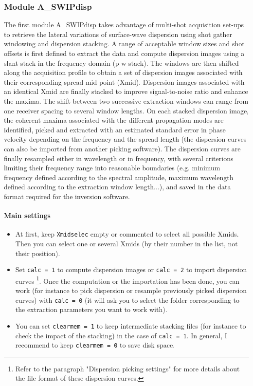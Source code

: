 \documentclass[twoside,a4paper]{article}
\begin{document}
\subsubsection{Module A\_SWIPdisp}
The first module A\_SWIPdisp takes advantage of multi-shot acquisition set-ups to retrieve the lateral variations of surface-wave dispersion using shot gather windowing and dispersion stacking. A range of acceptable window sizes and shot offsets is first defined to extract the data and compute dispersion images using a slant stack in the frequency domain (p-w stack). The windows are then shifted along the acquisition profile to obtain a set of dispersion images associated with their corresponding spread mid-point (Xmid). Dispersion images associated with an identical Xmid are finally stacked to improve signal-to-noise ratio and enhance the maxima. The shift between two successive extraction windows can range from one receiver spacing to several window lengths. On each stacked dispersion image, the coherent maxima associated with the different propagation modes are identified, picked and extracted with an estimated standard error in phase velocity depending on the frequency and the spread length (the dispersion curves can also be imported from another picking software). The dispersion curves are finally resampled either in wavelength or in frequency, with several criterions limiting their frequency range into reasonable boundaries (e.g. minimum frequency defined according to the spectral amplitude, maximum wavelength defined according to the extraction window length...), and saved in the data format required for the inversion software.

\paragraph{Main settings}
\begin{itemize}
\setlength\itemsep{2ex}
\setlength{\parindent}{5ex}
\item At first, keep \verb|Xmidselec| empty or commented to select all possible Xmids. Then you can select one or several Xmids (by their number in the list, not their position).

\item Set \verb|calc = 1| to compute dispersion images or \verb|calc = 2| to import dispersion curves \footnote{Refer to the paragraph "Dispersion picking settings" for more details about the file format of these dispersion curves.}. Once the computation or the importation has been done, you can work (for instance to pick dispersion or resample previously picked dispersion curves) with \verb|calc = 0| (it will ask you to select the folder corresponding to the extraction parameters you want to work with).

\item You can set \verb|clearmem = 1| to keep intermediate stacking files (for instance to check the impact of the stacking) in the case of \verb|calc = 1|. In general, I recommend to keep \verb|clearmem = 0| to save disk space.
\end{itemize}
\end{document}
